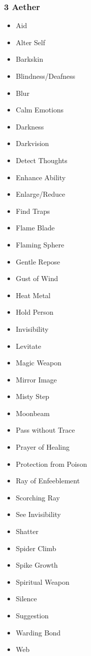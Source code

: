 \subsubsection{3 Aether}
\begin{itemize}
\item Aid
\item Alter Self
\item Barkskin
\item Blindness/Deafness
\item Blur
\item Calm Emotions
\item Darkness
\item Darkvision
\item Detect Thoughts
\item Enhance Ability
\item Enlarge/Reduce
\item Find Traps
\item Flame Blade
\item Flaming Sphere
\item Gentle Repose
\item Gust of Wind
\item Heat Metal
\item Hold Person
\item Invisibility
\item Levitate
\item Magic Weapon
\item Mirror Image
\item Misty Step
\item Moonbeam
\item Pass without Trace
\item Prayer of Healing
\item Protection from Poison
\item Ray of Enfeeblement
\item Scorching Ray
\item See Invisibility
\item Shatter
\item Spider Climb
\item Spike Growth
\item Spiritual Weapon
\item Silence
\item Suggestion
\item Warding Bond
\item Web
\end{itemize}

